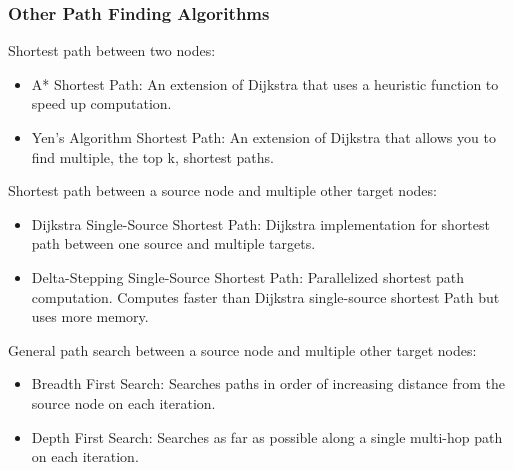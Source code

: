 \begin{frame}[fragile]\frametitle{Other Path Finding Algorithms}

 Shortest path between two nodes:
\begin{itemize}
\item A* Shortest Path: An extension of Dijkstra that uses a heuristic function to speed up computation.
\item Yen’s Algorithm Shortest Path: An extension of Dijkstra that allows you to find multiple, the top k, shortest paths.
\end{itemize}

Shortest path between a source node and multiple other target nodes:

\begin{itemize}
\item Dijkstra Single-Source Shortest Path: Dijkstra implementation for shortest path between one source and multiple targets.
\item Delta-Stepping Single-Source Shortest Path: Parallelized shortest path computation. Computes faster than Dijkstra single-source shortest Path but uses more memory.
\end{itemize}

General path search between a source node and multiple other target nodes:
\begin{itemize}

\item Breadth First Search: Searches paths in order of increasing distance from the source node on each iteration.
\item Depth First Search: Searches as far as possible along a single multi-hop path on each iteration.
\end{itemize}
\end{frame}


